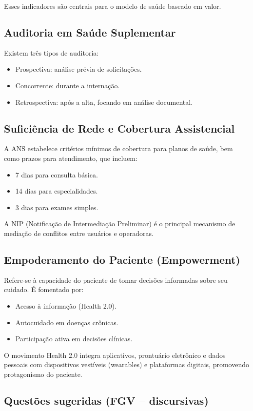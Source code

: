 \documentclass[a4paper,12pt]{article}
\begin{document}
Esses indicadores são centrais para o modelo de saúde baseado em valor.
\subsection{Auditoria em Saúde Suplementar}
\label{sec:org364f9b5}
Existem três tipos de auditoria:
\begin{itemize}
\item Prospectiva: análise prévia de solicitações.
\item Concorrente: durante a internação.
\item Retrospectiva: após a alta, focando em análise documental.
\end{itemize}
\subsection{Suficiência de Rede e Cobertura Assistencial}
\label{sec:org74b0f22}
A ANS estabelece critérios mínimos de cobertura para planos de saúde, bem como prazos para atendimento, que incluem:
\begin{itemize}
\item 7 dias para consulta básica.
\item 14 dias para especialidades.
\item 3 dias para exames simples.
\end{itemize}

A NIP (Notificação de Intermediação Preliminar) é o principal mecanismo de mediação de conflitos entre usuários e operadoras.
\subsection{Empoderamento do Paciente (Empowerment)}
\label{sec:org9270623}
Refere-se à capacidade do paciente de tomar decisões informadas sobre seu cuidado. É fomentado por:
\begin{itemize}
\item Acesso à informação (Health 2.0).
\item Autocuidado em doenças crônicas.
\item Participação ativa em decisões clínicas.
\end{itemize}

O movimento Health 2.0 integra aplicativos, prontuário eletrônico e dados pessoais com dispositivos vestíveis (wearables) e plataformas digitais, promovendo protagonismo do paciente.
\subsection{Questões sugeridas (FGV – discursivas)}
\label{sec:org45131e1}
\end{document}
